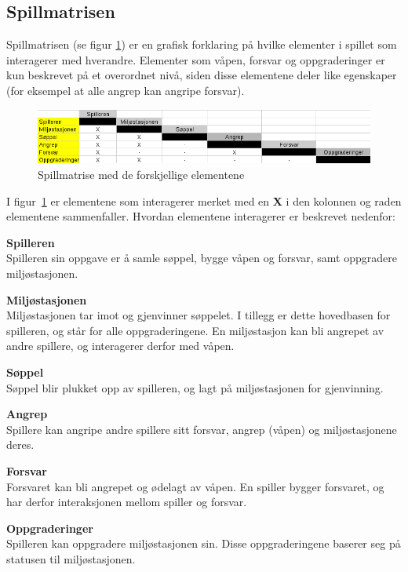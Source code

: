 \subsection{Spillmatrisen}
Spillmatrisen (se figur \ref{fig:spillmatrise}) er en grafisk forklaring
på hvilke elementer i spillet som interagerer med hverandre. Elementer
som våpen, forsvar og oppgraderinger er kun beskrevet på et overordnet
nivå, siden disse elementene deler like egenskaper (for eksempel at alle
angrep kan angripe forsvar).
\begin{center}
\begin{figure} [H]
\includegraphics[scale=0.6]{images/spillmatrise.png}
\caption{Spillmatrise med de forskjellige elementene}
\label{fig:spillmatrise}
\end{figure}
\end{center}
I figur~\ref{fig:spillmatrise} er elementene som interagerer merket
med en \textbf{X} i den kolonnen og raden elementene sammenfaller.
Hvordan elementene interagerer er beskrevet nedenfor:
\begin{description}
\item \textbf{Spilleren}\\Spilleren sin oppgave er å samle søppel,
bygge våpen og forsvar, samt oppgradere miljøstasjonen.
\item \textbf{Miljøstasjonen}\\Miljøstasjonen tar imot og gjenvinner
søppelet. I tillegg er dette hovedbasen for spilleren, og står for alle
oppgraderingene. En miljøstasjon kan bli angrepet av andre spillere, og
interagerer derfor med våpen.
\item \textbf{Søppel}\\Søppel blir plukket opp av spilleren, og lagt på
miljøstasjonen for gjenvinning.
\item \textbf{Angrep}\\Spillere kan angripe andre spillere sitt forsvar, angrep (våpen) 
og miljøstasjonene deres.
\item \textbf{Forsvar}\\Forsvaret kan bli angrepet og ødelagt av våpen.
En spiller bygger forsvaret, og har derfor interaksjonen mellom spiller og forsvar.
\item \textbf{Oppgraderinger}\\Spilleren kan oppgradere miljøstasjonen
sin. Disse oppgraderingene baserer seg på statusen til miljøstasjonen.
\end{description}

